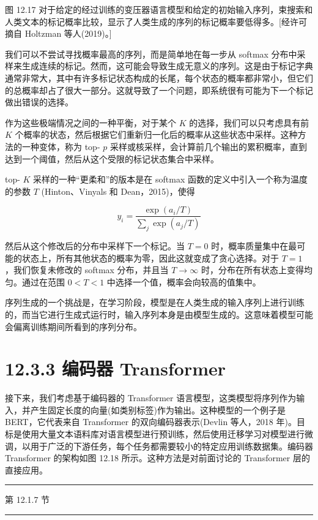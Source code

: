 \documentclass[10pt]{article}
\newcommand{\HRule}{\begin{center}\rule{0.9\linewidth}{0.2mm}\end{center}}
\begin{document}
图 12.17 对于给定的经过训练的变压器语言模型和给定的初始输入序列，束搜索和人类文本的标记概率比较，显示了人类生成的序列的标记概率要低得多。[经许可摘自 Holtzman 等人(2019)。]

我们可以不尝试寻找概率最高的序列，而是简单地在每一步从 softmax 分布中采样来生成连续的标记。然而，这可能会导致生成无意义的序列。这是由于标记字典通常非常大，其中有许多标记状态构成的长尾，每个状态的概率都非常小，但它们的总概率却占了很大一部分。这就导致了一个问题，即系统很有可能为下一个标记做出错误的选择。

作为这些极端情况之间的一种平衡，对于某个 \(K\) 的选择，我们可以只考虑具有前 \(K\) 个概率的状态，然后根据它们重新归一化后的概率从这些状态中采样。这种方法的一种变体，称为 top- \(p\) 采样或核采样，会计算前几个输出的累积概率，直到达到一个阈值，然后从这个受限的标记状态集合中采样。

top- \(K\) 采样的一种“更柔和”的版本是在 softmax 函数的定义中引入一个称为温度的参数 \(T\) (Hinton、Vinyals 和 Dean，2015)，使得

\[
{y}_{i} = \frac{\exp \left( {{a}_{i}/T}\right) }{\mathop{\sum }\limits_{j}\exp \left( {{a}_{j}/T}\right) } \tag{12.35}
\]

然后从这个修改后的分布中采样下一个标记。当 \(T = 0\) 时，概率质量集中在最可能的状态上，所有其他状态的概率为零，因此这就变成了贪心选择。对于 \(T = 1\) ，我们恢复未修改的 softmax 分布，并且当 \(T \rightarrow  \infty\) 时，分布在所有状态上变得均匀。通过在范围 \(0 < T < 1\) 中选择一个值，概率会向较高的值集中。

序列生成的一个挑战是，在学习阶段，模型是在人类生成的输入序列上进行训练的，而当它进行生成式运行时，输入序列本身是由模型生成的。这意味着模型可能会偏离训练期间所看到的序列分布。

\section*{12.3.3 编码器 Transformer}

接下来，我们考虑基于编码器的 Transformer 语言模型，这类模型将序列作为输入，并产生固定长度的向量(如类别标签)作为输出。这种模型的一个例子是 BERT，它代表来自 Transformer 的双向编码器表示(Devlin 等人，2018 年)。目标是使用大量文本语料库对语言模型进行预训练，然后使用迁移学习对模型进行微调，以用于广泛的下游任务，每个任务都需要较小的特定应用训练数据集。编码器 Transformer 的架构如图 12.18 所示。这种方法是对前面讨论的 Transformer 层的直接应用。

\HRule

第 12.1.7 节

\HRule
\end{document}
